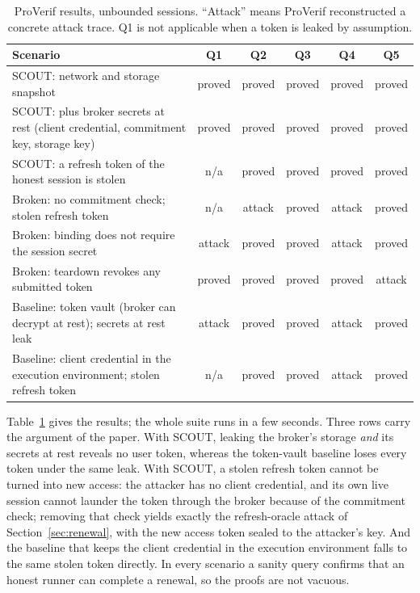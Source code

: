 \documentclass[11pt]{article}
\begin{document}
\begin{table}[t]
\centering
\small
\begin{tabular}{@{}p{}ccccc@{}}
\toprule
Scenario & Q1 & Q2 & Q3 & Q4 & Q5 \\
\midrule
SCOUT: network and storage snapshot & proved & proved & proved & proved & proved \\
SCOUT: plus broker secrets at rest (client credential, commitment key, storage key) & proved & proved & proved & proved & proved \\
SCOUT: a refresh token of the honest session is stolen & n/a & proved & proved & proved & proved \\
\midrule
Broken: no commitment check; stolen refresh token & n/a & attack & proved & attack & proved \\
Broken: binding does not require the session secret & attack & proved & proved & attack & proved \\
Broken: teardown revokes any submitted token & proved & proved & proved & proved & attack \\
Baseline: token vault (broker can decrypt at rest); secrets at rest leak & attack & proved & proved & attack & proved \\
Baseline: client credential in the execution environment; stolen refresh token & n/a & proved & proved & attack & proved \\
\bottomrule
\end{tabular}
\caption{ProVerif results, unbounded sessions. ``Attack'' means ProVerif reconstructed a concrete attack trace. Q1 is not applicable when a token is leaked by assumption.}
\label{tab:pv}
\end{table}

Table~\ref{tab:pv} gives the results; the whole suite runs in a few seconds. Three rows carry the argument of the paper. With SCOUT, leaking the broker's storage \emph{and} its secrets at rest reveals no user token, whereas the token-vault baseline loses every token under the same leak. With SCOUT, a stolen refresh token cannot be turned into new access: the attacker has no client credential, and its own live session cannot launder the token through the broker because of the commitment check; removing that check yields exactly the refresh-oracle attack of Section~\ref{sec:renewal}, with the new access token sealed to the attacker's key. And the baseline that keeps the client credential in the execution environment falls to the same stolen token directly. In every scenario a sanity query confirms that an honest runner can complete a renewal, so the proofs are not vacuous.
\end{document}
